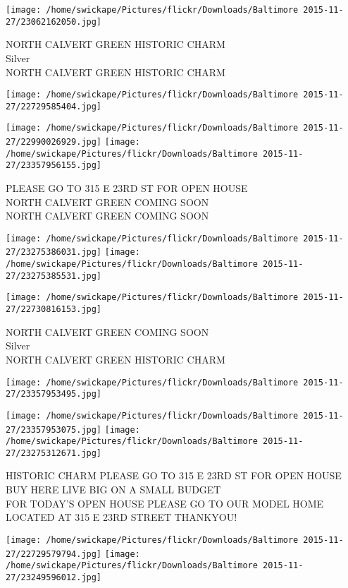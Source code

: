 \documentclass[10pt,letterpaper]{article}
\begin{document}
\texttt{[image: /home/swickape/Pictures/flickr/Downloads/Baltimore 2015-11-27/23062162050.jpg]}

NORTH CALVERT GREEN HISTORIC CHARM\\
Silver\\
NORTH CALVERT GREEN HISTORIC CHARM
\pagebreak

\texttt{[image: /home/swickape/Pictures/flickr/Downloads/Baltimore 2015-11-27/22729585404.jpg]}

\vspace{0.25in}
\texttt{[image: /home/swickape/Pictures/flickr/Downloads/Baltimore 2015-11-27/22990026929.jpg]}
\texttt{[image: /home/swickape/Pictures/flickr/Downloads/Baltimore 2015-11-27/23357956155.jpg]}

PLEASE GO TO 315 E 23RD ST FOR OPEN HOUSE\\
NORTH CALVERT GREEN COMING SOON\\
NORTH CALVERT GREEN COMING SOON
\pagebreak

\texttt{[image: /home/swickape/Pictures/flickr/Downloads/Baltimore 2015-11-27/23275386031.jpg]}
\texttt{[image: /home/swickape/Pictures/flickr/Downloads/Baltimore 2015-11-27/23275385531.jpg]}

\texttt{[image: /home/swickape/Pictures/flickr/Downloads/Baltimore 2015-11-27/22730816153.jpg]}

NORTH CALVERT GREEN COMING SOON\\
Silver\\
NORTH CALVERT GREEN HISTORIC CHARM
\pagebreak

\texttt{[image: /home/swickape/Pictures/flickr/Downloads/Baltimore 2015-11-27/23357953495.jpg]}

\vspace{0.25in}
\texttt{[image: /home/swickape/Pictures/flickr/Downloads/Baltimore 2015-11-27/23357953075.jpg]}
\texttt{[image: /home/swickape/Pictures/flickr/Downloads/Baltimore 2015-11-27/23275312671.jpg]}

HISTORIC CHARM PLEASE GO TO 315 E 23RD ST FOR OPEN HOUSE\\
BUY HERE LIVE BIG ON A SMALL BUDGET\\
FOR TODAY'S OPEN HOUSE PLEASE GO TO OUR MODEL HOME LOCATED AT 315 E 23RD STREET THANKYOU!
\pagebreak

\texttt{[image: /home/swickape/Pictures/flickr/Downloads/Baltimore 2015-11-27/22729579794.jpg]}
\texttt{[image: /home/swickape/Pictures/flickr/Downloads/Baltimore 2015-11-27/23249596012.jpg]}
\end{document}
